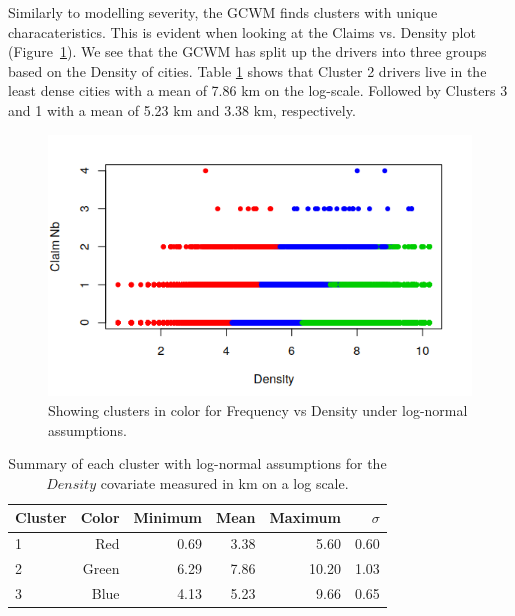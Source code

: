 \documentclass[11pt,letterpaper]{article}
\numberwithin{equation}{section}
\numberwithin{equation}{section}
\numberwithin{equation}{section}
\begin{document}
Similarly to modelling severity, the GCWM finds clusters with unique characateristics. This is evident when looking at the Claims vs. Density plot (Figure~\ref{frequencyGraph}). We see that the GCWM has split up the drivers into three groups based on the Density of cities. Table \ref{summarycovariates} shows that Cluster 2 drivers live in the least dense cities with a mean of 7.86 km on the log-scale. Followed by Clusters 3 and 1 with a mean of 5.23 km and 3.38 km, respectively.
\begin{figure}[!ht]
\begin{center}
\includegraphics[scale=0.80]{frequency.png}
\end{center}
\vspace{-0.2in}\caption{Showing clusters in color for Frequency vs Density under log-normal assumptions.}
\label{frequencyGraph}
\end{figure}
\begin{table}[!htb]
 \begin{center}
 \caption{Summary of each cluster with log-normal assumptions for the $Density$ covariate measured in km on a log scale.} \label{summarycovariates}
\begin{tabular}{lrrrrr}
\hline
Cluster  & Color & Minimum & Mean & Maximum & $\sigma$  \\
\hline
1 &   Red         & 0.69    & 3.38 & 5.60    & 0.60  \\
2 &  Green       & 6.29    & 7.86 & 10.20   & 1.03  \\
3 &  Blue        & 4.13    & 5.23 & 9.66    & 0.65 \\
\hline
\end{tabular}
\end{center}
\end{table}
\end{document}
